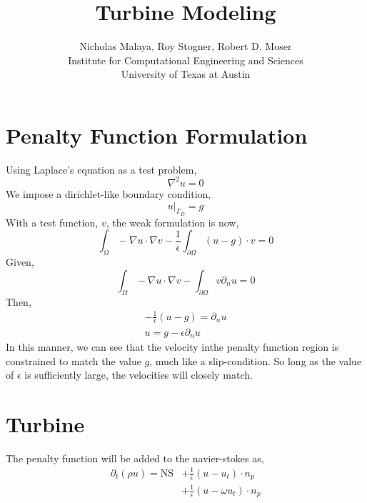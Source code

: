 \documentclass{article}
\title{\bf{Turbine Modeling}}
\author{Nicholas Malaya, Roy Stogner, Robert D. Moser \\ Institute for Computational Engineering and Sciences \\ University of Texas at Austin} \date{}
\begin{document}
\maketitle

\newpage

\section{Penalty Function Formulation}

Using Laplace's equation as a test problem, 
\begin{equation}
 \nabla^2 u = 0 
\end{equation}
We impose a dirichlet-like boundary condition, 
\begin{equation}
 u|_{\Gamma_D} = g
\end{equation}
With a test function, $v$, the weak formulation is now, 
\begin{equation}
\int_{\Omega}  - \nabla u \cdot \nabla v - \frac{1}{\epsilon}
 \int_{\partial \Omega} (u-g) \cdot v = 0 
\end{equation}
Given, 
\begin{equation}
\int_{\Omega}  - \nabla u \cdot \nabla v - 
 \int_{\partial \Omega} v \partial_n u = 0 
\end{equation}
Then, 
\begin{align}
-\frac{1}{\epsilon}(u-g) = \partial_n u \\
 u = g - \epsilon \partial_n u 
\end{align}
In this manner, we can see that the velocity inthe penalty function
region is constrained to match the value $g$, much like a
slip-condition. So long as the value of $\epsilon$ is sufficiently
large, the velocities will closely match. 


\section{Turbine}

The penalty function will be added to the navier-stokes as, 
\begin{align}
 \partial_t(\rho u) = \text{NS} &+ \frac{1}{\epsilon}(u-u_t)\cdot n_p \\
                                &+ \frac{1}{\epsilon}(u-\omega u_t)\cdot n_p \\
\end{align}
\end{document}
